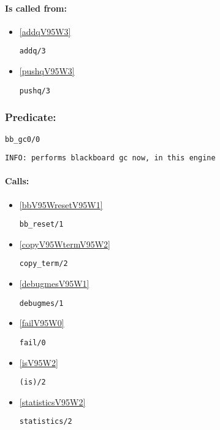 \paragraph{Is called from:} 
\begin{itemize}
\item \ref{addqV95W3} 
\begin{verbatim}
addq/3
\end{verbatim}

\item \ref{pushqV95W3} 
\begin{verbatim}
pushq/3
\end{verbatim}

\end{itemize}

\subsubsection{Predicate:} \label{bbV95Wgc0V95W0}

\begin{verbatim}
bb_gc0/0
\end{verbatim}

{\small \begin{verbatim}
INFO: performs blackboard gc now, in this engine

\end{verbatim}}
\paragraph{Calls:} 
\begin{itemize}
\item \ref{bbV95WresetV95W1} 
\begin{verbatim}
bb_reset/1
\end{verbatim}

\item \ref{copyV95WtermV95W2} 
\begin{verbatim}
copy_term/2
\end{verbatim}

\item \ref{debugmesV95W1} 
\begin{verbatim}
debugmes/1
\end{verbatim}

\item \ref{failV95W0} 
\begin{verbatim}
fail/0
\end{verbatim}

\item \ref{isV95W2} 
\begin{verbatim}
(is)/2
\end{verbatim}

\item \ref{statisticsV95W2} 
\begin{verbatim}
statistics/2
\end{verbatim}

\end{itemize}

